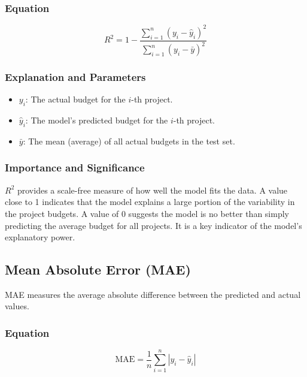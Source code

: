 \documentclass[12pt, a4paper]{article}
\begin{document}
\subsubsection{Equation}
\begin{equation}
R^2 = 1 - \frac{\sum_{i=1}^{n} (y_i - \hat{y}_i)^2}{\sum_{i=1}^{n} (y_i - \bar{y})^2}
\label{eq:r2}
\end{equation}

\subsubsection{Explanation and Parameters}
\begin{itemize}
    \item \textbf{$y_i$}: The actual budget for the $i$-th project.
    \item \textbf{$\hat{y}_i$}: The model's predicted budget for the $i$-th project.
    \item \textbf{$\bar{y}$}: The mean (average) of all actual budgets in the test set.
\end{itemize}

\subsubsection{Importance and Significance}
$R^2$ provides a scale-free measure of how well the model fits the data. A value close to 1 indicates that the model explains a large portion of the variability in the project budgets. A value of 0 suggests the model is no better than simply predicting the average budget for all projects. It is a key indicator of the model's explanatory power.

\subsection{Mean Absolute Error (MAE)}
MAE measures the average absolute difference between the predicted and actual values.

\subsubsection{Equation}
\begin{equation}
\text{MAE} = \frac{1}{n} \sum_{i=1}^{n} |y_i - \hat{y}_i|
\label{eq:mae}
\end{equation}
\end{document}
